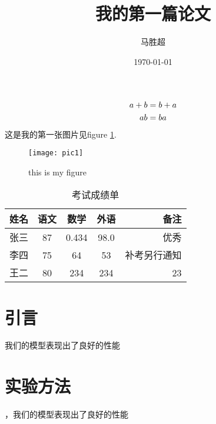 \documentclass{article}%
\title{\heiti 我的第一篇论文}
\author{\kaishu 马胜超}
\date{\today}
\begin{document}
    \maketitle
    \tableofcontents%
    \begin{gather}%
    a+b=b+a\\
    ab=ba \notag%
    \end{gather}
    这是我的第一张图片见figure \ref {fig-pic1}.
    \begin{figure}[htbp]
    \centering
    \texttt{[image: pic1]}%
     \caption{this is my figure}\label{fig-pic1}

    \end{figure}
    \begin{table}
    \centering
    \caption{考试成绩单}
    \begin{tabular}{|l||c|c|c|r|}
    \hline
    姓名&语文&数学&外语&备注\\
    \hline \hline
    张三&87&0.434&98.0&优秀\\
    \hline
    李四&75&64&53&补考另行通知\\
    \hline
    王二& 80&234&234&23\\
    \hline
    \end{tabular}
    \end{table}
    \section{引言}
    我们的模型表现出了良好的性能
    \section{实验方法}
    ，我们的模型表现出了良好的性能
\end{document}
